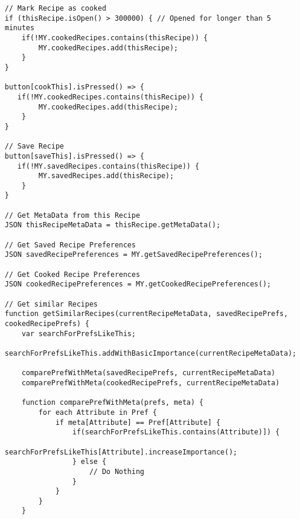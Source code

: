 \listoffigures
\newpage
	

\lstlistoflistings
\newpage
\begin{lstlisting}[caption=Pseudocode - Ähnliche Rezepte,label={lst:SimilarRecipies}]
// Mark Recipe as cooked
if (thisRecipe.isOpen() > 300000) { // Opened for longer than 5 minutes
    if(!MY.cookedRecipes.contains(thisRecipe)) { 
        MY.cookedRecipes.add(thisRecipe);
    }
}

button[cookThis].isPressed() => {
   if(!MY.cookedRecipes.contains(thisRecipe)) {
        MY.cookedRecipes.add(thisRecipe);
    }
}

// Save Recipe
button[saveThis].isPressed() => {
   if(!MY.savedRecipes.contains(thisRecipe)) {
        MY.savedRecipes.add(thisRecipe);
    }
}

// Get MetaData from this Recipe
JSON thisRecipeMetaData = thisRecipe.getMetaData();

// Get Saved Recipe Preferences
JSON savedRecipePreferences = MY.getSavedRecipePreferences();

// Get Cooked Recipe Preferences
JSON cookedRecipePreferences = MY.getCookedRecipePreferences();

// Get similar Recipes
function getSimilarRecipes(currentRecipeMetaData, savedRecipePrefs, cookedRecipePrefs) {
    var searchForPrefsLikeThis;
    searchForPrefsLikeThis.addWithBasicImportance(currentRecipeMetaData);

    comparePrefWithMeta(savedRecipePrefs, currentRecipeMetaData)
    comparePrefWithMeta(cookedRecipePrefs, currentRecipeMetaData)
    
    function comparePrefWithMeta(prefs, meta) {
        for each Attribute in Pref {
            if meta[Attribute] == Pref[Attribute] {
                if(searchForPrefsLikeThis.contains(Attribute)]) {
                    searchForPrefsLikeThis[Attribute].increaseImportance();
                } else {
                    // Do Nothing
                }
            }
        }
    }


\end{lstlisting}
